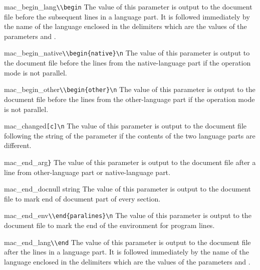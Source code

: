 \begin{describepara}{mac_begin_lang}{\verb*|\\begin|}\describe
The value of this parameter is output to the document file before the
subsequent lines in a language part. It is followed immediately by the
name of the language enclosed in the delimiters which are the values of the
parameters  and .
\end{describepara}
\begin{describepara}{mac_begin_native}{\verb*|\\begin{native}\n|}\describe
The value of this parameter is output to the document file before the lines
from the native-language part if the operation mode is not parallel.
\end{describepara}
\begin{describepara}{mac_begin_other}{\verb*|\\begin{other}\n|}\describe
The value of this parameter is output to the document file before the lines
from the other-language part if the operation mode is not parallel.
\end{describepara}
\begin{describepara}{mac_changed}{\verb*|[c]\n|}\describe
The value of this parameter is output to the document file following
the string of the parameter  if the contents of the two
language parts are different.
\end{describepara}
\begin{describepara}{mac_end_arg}{\verb*|}|}\describe
The value of this parameter is output to the document file after a line
from other-language part or native-language part.
\end{describepara}
\begin{describepara}{mac_end_doc}{null string}\describe
The value of this parameter is output to the document file to mark
end of document part of every section.
\end{describepara}
\begin{describepara}{mac_end_env}{\verb*|\\end{paralines}\n|}\describe
The value of this parameter is output to the document file to
mark the end of the environment for program lines.
\end{describepara}
\begin{describepara}{mac_end_lang}{\verb*|\\end|}\describe
The value of this parameter is output to the document file after the
lines in a language part. It is followed immediately by the
name of the language enclosed in the delimiters which are the values of the
parameters  and .
\end{describepara}
